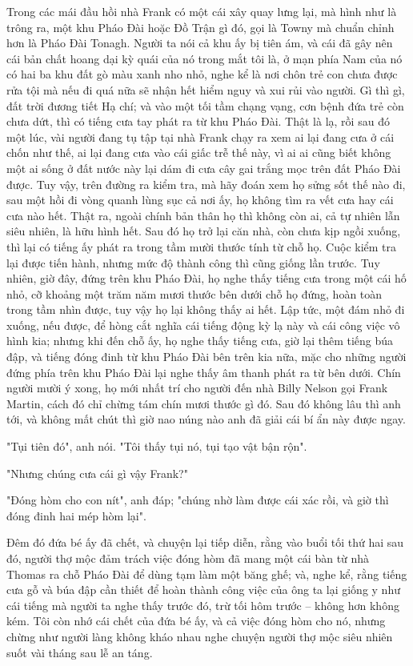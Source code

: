 Trong các mái đầu hồi nhà Frank có một cái xây quay lưng lại, mà hình như là trông ra, một khu Pháo Đài hoặc Đồ Trận gì đó, gọi là Towny mà chuẩn chỉnh hơn là Pháo Đài Tonagh. Người ta nói cả khu ấy bị tiên ám, và cái đã gây nên cái bản chất hoang dại kỳ quái của nó trong mắt tôi là, ở mạn phía Nam của nó có hai ba khu đất gò màu xanh nho nhỏ, nghe kể là nơi chôn trẻ con chưa được rửa tội mà nếu đi quá nữa sẽ nhận hết hiểm nguy và xui rủi vào người. Gì thì gì, đất trời đương tiết Hạ chí; và vào một tối tầm chạng vạng, cơn bệnh đứa trẻ còn chưa dứt, thì có tiếng cưa tay phát ra từ khu Pháo Đài. Thật là lạ, rồi sau đó một lúc, vài người đang tụ tập tại nhà Frank chạy ra xem ai lại đang cưa ở cái chốn như thế, ai lại đang cưa vào cái giấc trễ thế này, vì ai ai cũng biết không một ai sống ở đất nước này lại dám đi cưa cây gai trắng mọc trên đất Pháo Đài được. Tuy vậy, trên đường ra kiểm tra, mà hãy đoán xem họ sửng sốt thế nào đi, sau một hồi đi vòng quanh lùng sục cả nơi ấy, họ không tìm ra vết cưa hay cái cưa nào hết. Thật ra, ngoài chính bản thân họ thì không còn ai, cả tự nhiên lẫn siêu nhiên, là hữu hình hết. Sau đó họ trở lại căn nhà, còn chưa kịp ngồi xuống, thì lại có tiếng ấy phát ra trong tầm mười thước tính từ chỗ họ. Cuộc kiểm tra lại được tiến hành, nhưng mức độ thành công thì cũng giống lần trước. Tuy nhiên, giờ đây, đứng trên khu Pháo Đài, họ nghe thấy tiếng cưa trong một cái hố nhỏ, cỡ khoảng một trăm năm mươi thước bên dưới chỗ họ đứng, hoàn toàn trong tầm nhìn được, tuy vậy họ lại không thấy ai hết. Lập tức, một đám nhỏ đi xuống, nếu được, để hòng cắt nghĩa cái tiếng động kỳ lạ này và cái công việc vô hình kia; nhưng khi đến chỗ ấy, họ nghe thấy tiếng cưa, giờ lại thêm tiếng búa đập, và tiếng đóng đinh từ khu Pháo Đài bên trên kia nữa, mặc cho những người đứng phía trên khu Pháo Đài lại nghe thấy âm thanh phát ra từ bên dưới. Chín người mười ý xong, họ mới nhất trí cho người đến nhà Billy Nelson gọi Frank Martin, cách đó chỉ chừng tám chín mươi thước gì đó. Sau đó không lâu thì anh tới, và không mất chút thì giờ nao núng nào anh đã giải cái bí ẩn này được ngay.

"Tụi tiên đó", anh nói. "Tôi thấy tụi nó, tụi tạo vật bận rộn".

"Nhưng chúng cưa cái gì vậy Frank?"

"Đóng hòm cho con nít", anh đáp; "chúng nhờ làm được cái xác rồi, và giờ thì đóng đinh hai mép hòm lại".

Đêm đó đứa bé ấy đã chết, và chuyện lại tiếp diễn, rằng vào buổi tối thứ hai sau đó, người thợ mộc đảm trách việc đóng hòm đã mang một cái bàn từ nhà Thomas ra chỗ Pháo Đài để dùng tạm làm một băng ghế; và, nghe kể, rằng tiếng cưa gỗ và búa đập cần thiết để hoàn thành công việc của ông ta lại giống y như cái tiếng mà người ta nghe thấy trước đó, trừ tối hôm trước – không hơn không kém. Tôi còn nhớ cái chết của đứa bé ấy, và cả việc đóng hòm cho nó, nhưng chừng như người làng không kháo nhau nghe chuyện người thợ mộc siêu nhiên suốt vài tháng sau lễ an táng.

